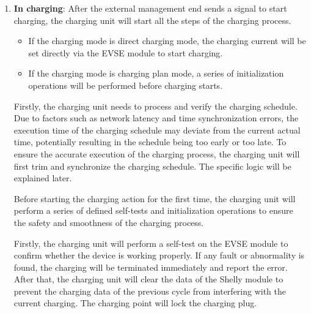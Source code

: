 \documentclass[
english,
ruledheaders=section,%
class=report,%
thesis={type=Report},%
accentcolor=9c,%
custommargins=true,%
marginpar=false,%
parskip=half-,%
fontsize=11pt,%
logofile={img/tuda_logo.pdf}, %
]{tudapub}
\begin{document}
\begin{enumerate}[label=\Alph*.]
        \item \textbf{In charging}:
        \label{item:inCharging}
        After the external management end sends a signal to start charging, the charging unit will start all the steps of the charging process.
        \begin{itemize}
            \item If the charging mode is direct charging mode, the charging current will be set directly via the EVSE module to start charging.
            \item If the charging mode is charging plan mode, a series of initialization operations will be performed before charging starts.
        \end{itemize}



        Firstly, the charging unit needs to process and verify the charging schedule. Due to factors such as network latency and time synchronization errors, the execution time of the charging schedule may deviate from the current actual time, potentially resulting in the schedule being too early or too late. To ensure the accurate execution of the charging process, the charging unit will first trim and synchronize the charging schedule. The specific logic will be explained later.


        Before starting the charging action for the first time, the charging unit will perform a series of defined self-tests and initialization operations to ensure the safety and smoothness of the charging process.

        Firstly, the charging unit will perform a self-test on the EVSE module to confirm whether the device is working properly. If any fault or abnormality is found, the charging will be terminated immediately and report the error. After that, the charging unit will clear the data of the Shelly module to prevent the charging data of the previous cycle from interfering with the current charging. The charging point will lock the charging plug.



\end{enumerate}
\end{document}
